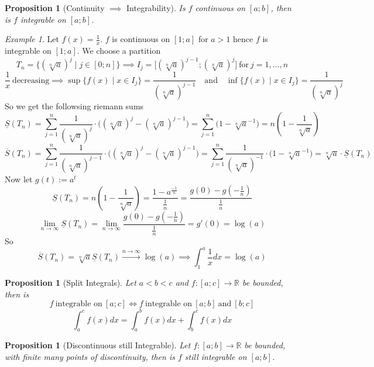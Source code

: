 \documentclass[english,titlepage]{uzhpub}
\theoremstyle{definition}
\theoremstyle{plain}
\newtheorem{proposition}[definition]{Proposition}
\theoremstyle{remark}
\theoremstyle{example}
\newtheorem*{example}{Example}
\begin{document}
   \begin{proposition}[Continuity \(\implies\) Integrability]\label{pro:cont_impl_integr}
      Is \(f\) continuous on \([a;b]\), then is \(f\) integrable on \([a;b]\).
   \end{proposition}
   \begin{example}
      Let \(f(x) = \frac{1}{x}\).
      \(f\) is continuous on \([1; a]\) for \(a > 1\) hence \(f\) is integrable on \([1; a]\).
      We choose a partition
      \[T_n = \{(\sqrt[n]{a})^j \mid j \in [0; n]\} \implies I_j = \big[(\sqrt[n]{a})^{j-1}; (\sqrt[n]{a})^j\big]~\text{for}~j = 1, \ldots, n\]
      \[\frac{1}{x}~\text{decreasing} \implies \sup\{f(x) \mid x \in I_j\} = \frac{1}{(\sqrt[n]{a})^{j-1}} \quad\text{and}\quad \inf\{f(x) \mid x \in I_j\} = \frac{1}{(\sqrt[n]{a})^j}\]
      So we get the followsing riemann sums
      \[\underline{S}(T_n) = \sum_{j=1}^n \frac{1}{(\sqrt[n]{a})^j} \cdot \big((\sqrt[n]{a})^j - (\sqrt[n]{a})^{j-1}\big) = \sum_{j=1}^n \big(1 - \sqrt[n]{a}^{-1}\big) = n \left(1 - \frac{1}{\sqrt[n]{a}}\right)\]
      \[\overline{S}(T_n) = \sum_{j=1}^n \frac{1}{(\sqrt[n]{a})^{j-1}} \cdot \big((\sqrt[n]{a})^j - (\sqrt[n]{a})^{j-1}\big) = \sum_{j=1}^n \frac{1}{(\sqrt[n]{a})^{-1}} \cdot \big(1 - \sqrt[n]{a}^{-1}\big) = \sqrt[n]{a} \cdot \underline{S}(T_n)\]
      Now let \(g(t) := a^t\)
      \[\underline{S}(T_n) = n \left(1 - \frac{1}{\sqrt[n]{a}}\right) = \frac{1 - a^{\frac{-1}{n}}}{\frac{1}{n}} = \frac{g(0) - g\left(-\frac{1}{n}\right)}{\frac{1}{n}}\]
      \[\lim_{n \to \infty} \underline{S}(T_n) = \lim_{n \to \infty}\frac{g(0) - g\left(-\frac{1}{n}\right)}{\frac{1}{n}} = g'(0) = \log(a)\]
      So
      \[\overline{S}(T_n) = \sqrt[n]{a}\underline{S}(T_n) \xrightarrow{n \to \infty} \log(a) \implies \int_1^a \frac{1}{x}dx = \log(a)\]
   \end{example}

   \begin{proposition}[Split Integrals]\label{pro:split_integrals}
      Let \(a < b < c\) and \(f: [a; c] \to \mathbb{R}\) be bounded, then is
      \[f~\text{integrable on}~[a;c] \iff f~\text{integrable on}~[a;b]~\text{and}~[b;c]\]
      \[\int_a^c f(x) dx = \int_a^b f(x) dx + \int_b^c f(x) dx\]
   \end{proposition}

   \begin{proposition}[Discontinuous still Integrable]\label{pro:discont_integrable}
      Let \(f: [a;b] \to \mathbb{R}\) be bounded, with finite many points of discontinuity, then is \(f\) still integrable on \([a;b]\).
   \end{proposition}
\end{document}
